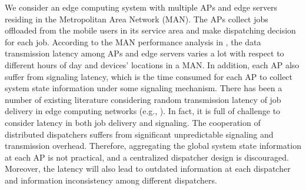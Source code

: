 We consider an edge computing system with multiple APs and edge servers residing in the Metropolitan Area Network (MAN).
The APs collect jobs offloaded from the mobile users in its service area and make dispatching decision for each job. According to the MAN performance analysis in \cite{MAN-LATENCY}, the data transmission latency {among APs and edge servers} varies a lot with respect to different hours of day and devices' locations in a MAN. {In addition, each AP also suffer from signaling latency, which is the time consumed for each AP to collect system state information under some signaling mechanism.}
There has been a number of existing literature considering random transmission latency of job delivery in edge computing networks (e.g., \cite{latency-EDGE19,MOBIHOC19-ZhouZ,IOTJ18-FanQ,TOC19-LiuC,JSAC19-AlameddineHA}). 
In fact, it is full of challenge to consider latency in {both job delivery and} signaling. The cooperation of distributed dispatchers suffers from significant unpredictable signaling and transmission overhead. Therefore, aggregating the global system state information at each AP is not practical, and a centralized dispatcher design is discouraged. Moreover, the latency will also lead to outdated information at each dispatcher and information inconsistency among different dispatchers.

